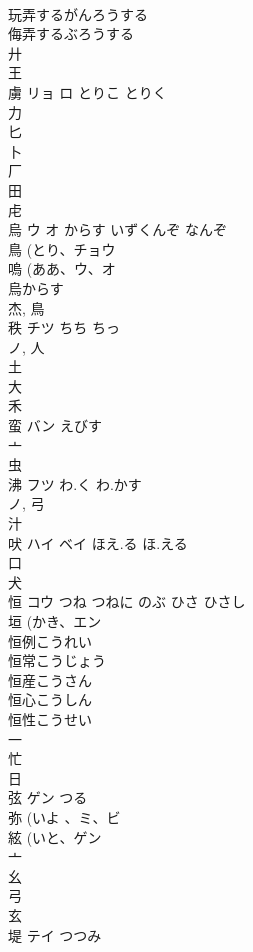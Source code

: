 \documentclass[8pt]{extreport}
\begin{document}
\begin{CJK}{UTF8}{min}
\\	玩弄するがんろうする 
\\	侮弄するぶろうする 
\\	廾 
\\	王 
\\	虜	リョ ロ	とりこ とりく	
\\	力 
\\	匕 
\\	卜 
\\	厂 
\\	田 
\\	虍 
\\	烏	ウ オ	からす いずくんぞ なんぞ	
\\	鳥 (とり、チョウ 
\\	嗚 (ああ、ウ、オ 
\\	烏からす 
\\	杰, 鳥 
\\	秩	チツ	ちち ちっ	
\\	ノ, 人 
\\	土 
\\	大 
\\	禾 
\\	蛮	バン	えびす	
\\	亠 
\\	虫 
\\	沸	フツ	わ.く わ.かす	
\\	ノ, 弓 
\\	汁 
\\	吠	ハイ ベイ	ほえ.る ほ.える	
\\	口 
\\	犬 
\\	恒	コウ	つね つねに のぶ ひさ ひさし	
\\	垣 (かき、エン 
\\	恒例こうれい
\\	恒常こうじょう
\\	恒産こうさん
\\	恒心こうしん
\\	恒性こうせい
\\	一 
\\	忙 
\\	日 
\\	弦	ゲン	つる	
\\	弥 (いよ 、ミ、ビ 
\\	絃 (いと、ゲン 
\\	亠 
\\	幺 
\\	弓 
\\	玄 
\\	堤	テイ	つつみ	

\end{CJK}
\end{document}
